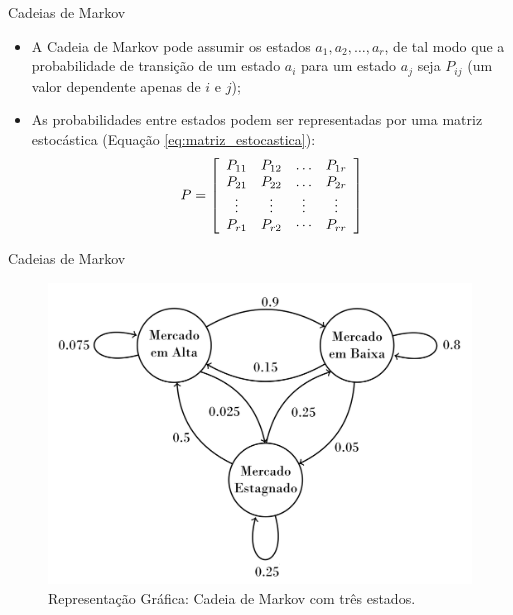 \documentclass[10pt]{beamer}
\begin{document}
\begin{frame}{Cadeias de Markov}
    \begin{itemize}
        \item<1 -> A Cadeia de Markov pode assumir os estados $a_1, a_2, \ldots, a_r$, de tal modo que a probabilidade de transição de um estado $a_i$ para um estado $a_j$ seja $P_{ij}$ (um valor dependente apenas de $i$ e $j$);
        \item<1 -> As probabilidades entre estados podem ser representadas por uma matriz estocástica (Equação \ref{eq:matriz_estocastica}):
        \begin{equation}
            \label{eq:matriz_estocastica}
            P = \left[ \begin{array} { c c c c } { P _ { 11 } } & { P _ { 12 } } & { \dots } & { P _ { 1 r } } \\ { P _ { 21 } } & { P _ { 22 } } & { \dots } & { P _ { 2 r } } \\ { \vdots } & { \vdots } & { \vdots } & { \vdots } \\ { P _ { r 1 } } & { P _ { r 2 } } & { \cdots } & { P _ { r r } } \end{array} \right]
        \end{equation}
      \end{itemize}
\end{frame}

\begin{frame}{Cadeias de Markov}
    \begin{figure}[H]
        \begin{center}
            \includegraphics[scale=0.23]{imagens/markov_chain_wikipedia.png}
            \caption{Representação Gráfica: Cadeia de Markov com três estados.}
            \label{fig:cadeia_markov_tres_estados}
        \end{center}
    \end{figure}
\end{frame}
\end{document}
